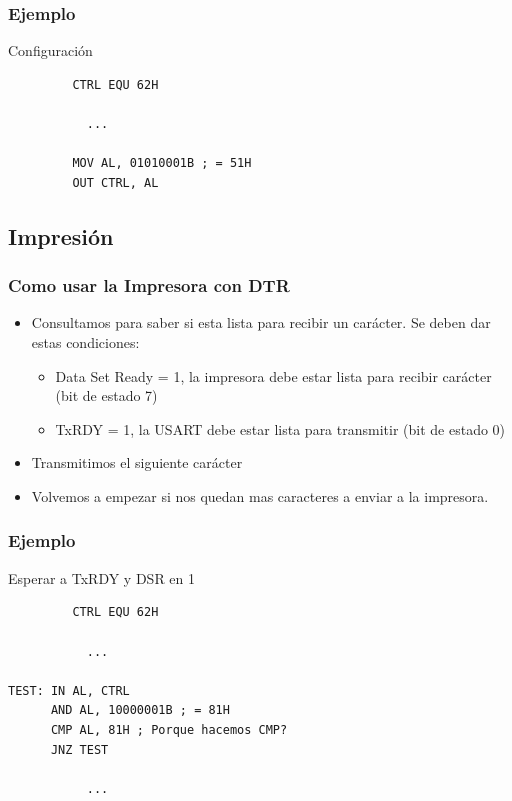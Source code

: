 \documentclass{beamer}
\begin{document}
\begin{frame}[fragile]
\frametitle{Ejemplo}
\begin{block}{Configuración}
 \begin{verbatim}
         CTRL EQU 62H
         
           ...
           
         MOV AL, 01010001B ; = 51H
         OUT CTRL, AL
 \end{verbatim}
\end{block}

\end{frame}

\subsection{Impresión}

\begin{frame}[fragile]
\frametitle{Como usar la Impresora con DTR}
\begin{itemize}
 \item  Consultamos para saber si esta lista para recibir un carácter. Se deben dar estas condiciones:
 \begin{itemize}
  \item Data Set Ready = 1, la impresora debe estar lista para recibir carácter (bit de estado 7)
  \item TxRDY = 1, la USART debe estar lista para transmitir (bit de estado 0) 
 \end{itemize}
\item Transmitimos el siguiente carácter 
\item Volvemos a empezar si nos quedan mas caracteres a enviar a la impresora.
\end{itemize}

\end{frame}


\begin{frame}[fragile]
\frametitle{Ejemplo}
\begin{block}{Esperar a TxRDY y DSR en 1}
 \begin{verbatim}
         CTRL EQU 62H
         
           ...
           
TEST: IN AL, CTRL
      AND AL, 10000001B ; = 81H
      CMP AL, 81H ; Porque hacemos CMP?
      JNZ TEST
      
           ...
 \end{verbatim}
\end{block}

\end{frame}
\end{document}
